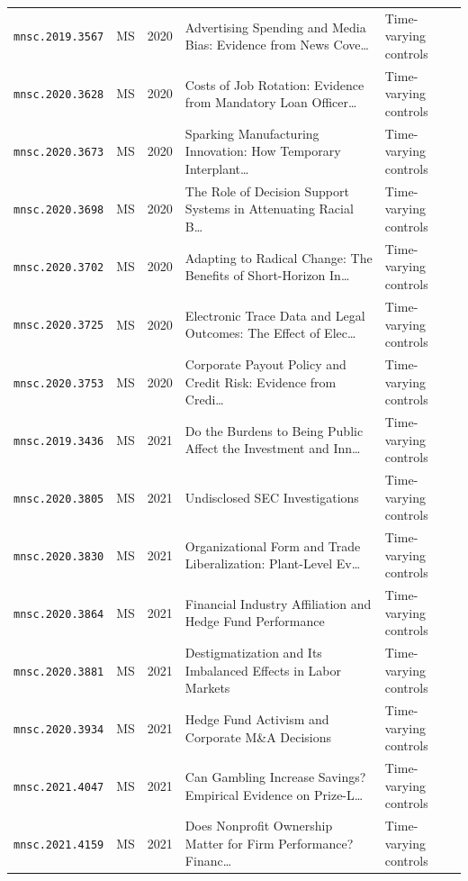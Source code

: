 \begin{longtable}{lccp{}l}
\texttt{mnsc.2019.3567} & MS & 2020 & \raggedright Advertising Spending and Media Bias: Evidence from News Cove\ldots{} & Time-varying controls \\
\texttt{mnsc.2020.3628} & MS & 2020 & \raggedright Costs of Job Rotation: Evidence from Mandatory Loan Officer\ldots{} & Time-varying controls \\
\texttt{mnsc.2020.3673} & MS & 2020 & \raggedright Sparking Manufacturing Innovation: How Temporary Interplant\ldots{} & Time-varying controls \\
\texttt{mnsc.2020.3698} & MS & 2020 & \raggedright The Role of Decision Support Systems in Attenuating Racial B\ldots{} & Time-varying controls \\
\texttt{mnsc.2020.3702} & MS & 2020 & \raggedright Adapting to Radical Change: The Benefits of Short-Horizon In\ldots{} & Time-varying controls \\
\texttt{mnsc.2020.3725} & MS & 2020 & \raggedright Electronic Trace Data and Legal Outcomes: The Effect of Elec\ldots{} & Time-varying controls \\
\texttt{mnsc.2020.3753} & MS & 2020 & \raggedright Corporate Payout Policy and Credit Risk: Evidence from Credi\ldots{} & Time-varying controls \\
\texttt{mnsc.2019.3436} & MS & 2021 & \raggedright Do the Burdens to Being Public Affect the Investment and Inn\ldots{} & Time-varying controls \\
\texttt{mnsc.2020.3805} & MS & 2021 & \raggedright Undisclosed SEC Investigations & Time-varying controls \\
\texttt{mnsc.2020.3830} & MS & 2021 & \raggedright Organizational Form and Trade Liberalization: Plant-Level Ev\ldots{} & Time-varying controls \\
\texttt{mnsc.2020.3864} & MS & 2021 & \raggedright Financial Industry Affiliation and Hedge Fund Performance & Time-varying controls \\
\texttt{mnsc.2020.3881} & MS & 2021 & \raggedright Destigmatization and Its Imbalanced Effects in Labor Markets & Time-varying controls \\
\texttt{mnsc.2020.3934} & MS & 2021 & \raggedright Hedge Fund Activism and Corporate M\&A Decisions & Time-varying controls \\
\texttt{mnsc.2021.4047} & MS & 2021 & \raggedright Can Gambling Increase Savings? Empirical Evidence on Prize-L\ldots{} & Time-varying controls \\
\texttt{mnsc.2021.4159} & MS & 2021 & \raggedright Does Nonprofit Ownership Matter for Firm Performance? Financ\ldots{} & Time-varying controls \\

\end{longtable}
